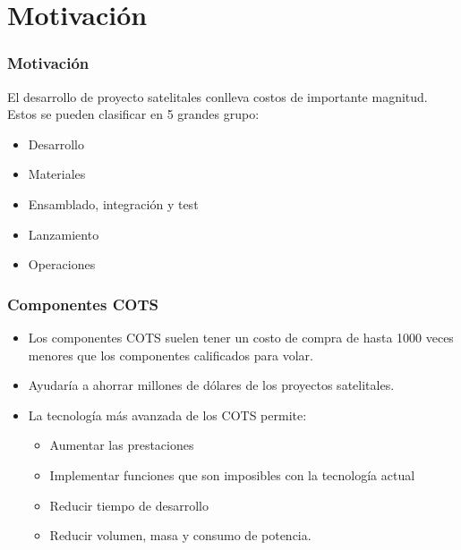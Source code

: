 \section{Motivación}
\begin{frame}
 \frametitle{Motivación}
	El desarrollo de proyecto satelitales conlleva costos de importante magnitud. Estos se pueden clasificar en 5 grandes grupo:
	\begin{itemize}
		\item Desarrollo
		\item Materiales
		\item Ensamblado, integración y test
		\item Lanzamiento
		\item Operaciones
	\end{itemize}
\end{frame}

\begin{frame}
	\frametitle{Componentes COTS}
	\begin{itemize}
		\item Los componentes COTS suelen tener un costo de compra  de hasta 1000 veces menores que los componentes calificados para volar.
		\item Ayudaría a ahorrar millones de dólares de los proyectos satelitales. 
		\item La tecnología más avanzada de los COTS permite:
		\begin{itemize}
			\item Aumentar las prestaciones
			\item Implementar funciones que son imposibles con la tecnología actual
			\item Reducir tiempo de desarrollo
			\item Reducir volumen, masa y consumo de potencia.
		\end{itemize}
	\end{itemize}



	

	
	
\end{frame}